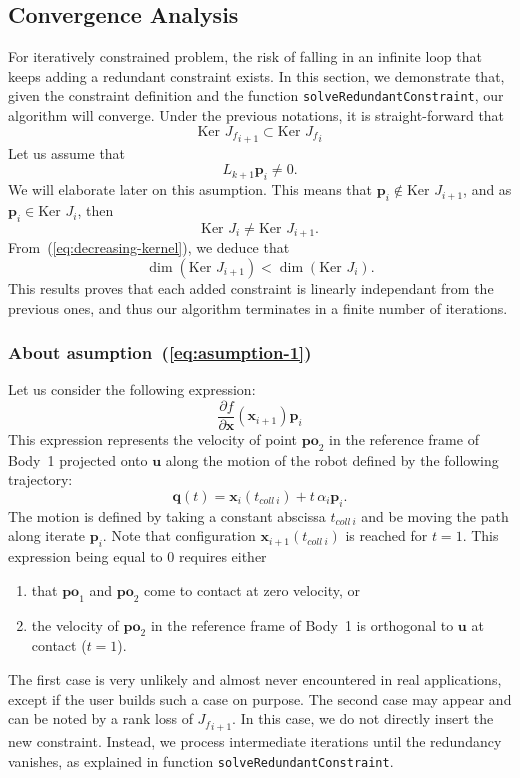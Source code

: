 \documentclass{tADR2e}
\newcommand\p{\mathbf{p}}
\newcommand\conf{\mathbf{q}}
\newcommand\xx{\mathbf{x}} %
\newcommand\po{\mathbf{po}}
\newcommand\Jf{{J_f}}
\newcommand\kernel{\mbox{Ker }}
\begin{document}
\subsection*{Convergence Analysis}
For iteratively constrained problem, the risk of falling in an infinite loop 
that keeps adding a redundant constraint exists.
In this section, we demonstrate that, given the constraint definition and the 
function \texttt{solveRedundantConstraint}, our 
algorithm will converge.
Under the previous notations, it is straight-forward that
\begin{equation}\label{eq:decreasing-kernel}
\kernel \Jf_{i+1} \subset \kernel \Jf_{i}
\end{equation}
Let us assume that
\begin{equation}\label{eq:asumption-1}
L_{k+1}\p_i \not= 0.
\end{equation}
We will elaborate later on this asumption. This means that $\p_{i}\notin\kernel J_{i+1}$, and as $\p_{i}\in\kernel J_{i}$, then
$$
\kernel J_i \not= \kernel J_{i+1}.
$$
From~(\ref{eq:decreasing-kernel}), we deduce that
$$
\dim (\kernel J_{i+1}) < \dim (\kernel J_i).
$$
This results proves that each added constraint is linearly independant from the 
previous ones, and thus our algorithm terminates in a finite number of iterations.

\subsubsection*{About asumption~(\ref{eq:asumption-1})}%
Let us consider the following expression:
$$
\frac{\partial f}{\partial \xx}(\xx_{i+1})\p_i
$$
This expression represents the velocity of point $\po_2$ in the reference frame of Body~1 projected onto $\mathbf{u}$ along the motion of the robot defined by the following trajectory:
\begin{equation}\label{eq:trajectory}
\conf (t) = \xx_{i}(t_{coll\ i}) + t\, \alpha_i \p_{i}.
\end{equation}
The motion is defined by taking a constant abscissa $t_{coll\ i}$ and be moving the 
path along iterate $\p_i$. Note that configuration $\xx_{i+1}(t_{coll\ i})$ is 
reached for $t=1$.
This expression being equal to 0 requires either
\begin {enumerate}
\item that $\po_1$ and $\po_2$ come to contact at zero velocity, or
\item the velocity of $\po_2$ in the reference frame of Body~1 is orthogonal to 
$\mathbf{u}$ at contact ($t=1$).
\end {enumerate}
The first case is very unlikely and almost never encountered in real applications, 
except if the user builds such a case on purpose.
The second case may appear and can be noted by a rank loss of $\Jf_{i+1}$. In this 
case, we do not directly insert the new constraint. Instead, we process intermediate 
iterations until the redundancy vanishes, as explained in function 
\texttt{solveRedundantConstraint}.
\end{document}
